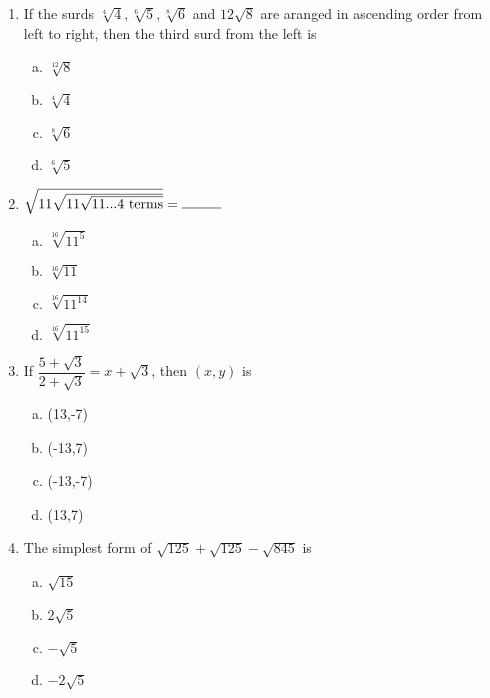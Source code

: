 \begin{multicols}{2}
\begin{enumerate}
\begin{multicols}{2}
\begin{enumerate}[(a)]
\item -5
\item -6
\item -4
\item -2
\end{enumerate}
\end{multicols}
\item If the surds $\sqrt[4]{4}, \sqrt[6]{5}, \sqrt[8]{6}$ and $12\sqrt{8}$ are aranged in ascending order from left to right, then the third surd from the left is
\begin{multicols}{2}
\begin{enumerate}[(a)]
\item $\sqrt[12]{8}$
\item $\sqrt[4]{4}$
\item $\sqrt[8]{6}$
\item $\sqrt[6]{5}$
\end{enumerate}
\end{multicols}
\item $\sqrt{11\sqrt{11\sqrt{
11...4 \text{ terms}}}} = \rule{1cm}{0.15mm}$
\begin{multicols}{2}
\begin{enumerate}[(a)]
\item $\sqrt[16]{11^5}$
\item  $\sqrt[16]{11}$
\item  $\sqrt[16]{11^{14}}$
\item  $\sqrt[16]{11^{15}}$
\end{enumerate}
\end{multicols}
\item If $\dfrac{5+\sqrt{3}}{2+\sqrt{3}} = x+\sqrt{3}$, then $(x,y)$ is
\begin{multicols}{2}
\begin{enumerate}[(a)]
\item (13,-7)
\item  (-13,7)
\item  (-13,-7)
\item  (13,7)
\end{enumerate}
\end{multicols}
\item The simplest form of $\sqrt{125}+\sqrt{125}-\sqrt{845}$ is 
\begin{multicols}{2}
\begin{enumerate}[(a)]
\item $\sqrt{15}$
\item  $2\sqrt{5}$
\item   $-\sqrt{5}$
\item $-2\sqrt{5}$ 

\end{enumerate}
\end{multicols}
\end{enumerate}
\end{multicols}
